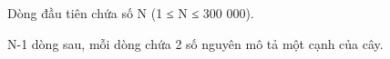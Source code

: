 Dòng đầu tiên chứa số N (1 ≤ N ≤ 300 000).  

   N-1 dòng sau, mỗi dòng chứa 2 số nguyên mô tả một cạnh   của cây.